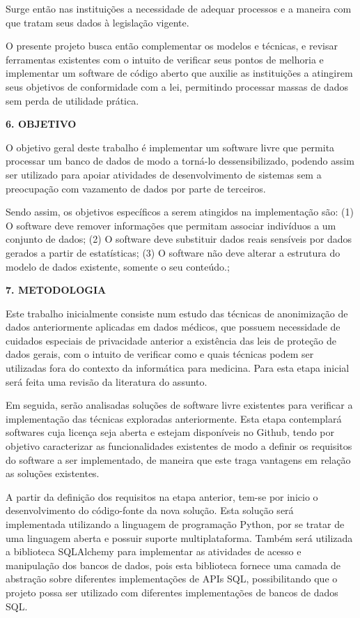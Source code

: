 \documentclass[a4paper,12pt,oneside,openany]{report}
\begin{document}
Surge então nas instituições a necessidade de adequar processos e a maneira com que tratam seus dados à legislação vigente.

O presente projeto busca então complementar os modelos e técnicas, e revisar ferramentas existentes com o intuito de verificar seus pontos de melhoria e implementar um software de código aberto que auxilie as instituições a atingirem seus objetivos de conformidade com a lei, permitindo processar massas de dados sem perda de utilidade prática.

\vspace{0.4cm}
\textbf{6. OBJETIVO}

O objetivo geral deste trabalho é implementar um software livre que permita processar um banco de dados de modo a torná-lo dessensibilizado, podendo assim ser utilizado para apoiar atividades de desenvolvimento de sistemas sem a preocupação com vazamento de dados por parte de terceiros.

Sendo assim, os objetivos específicos a serem atingidos na implementação são: (1) O software deve remover informações que permitam associar indivíduos a um conjunto de dados; (2) O software deve substituir dados reais sensíveis por dados gerados a partir de estatísticas; (3) O software não deve alterar a estrutura do modelo de dados existente, somente o seu conteúdo.;

\vspace{0.4cm}
\textbf{7. METODOLOGIA}

Este trabalho inicialmente consiste num estudo das técnicas de anonimização de dados anteriormente aplicadas em dados médicos, que possuem necessidade de cuidados especiais de privacidade anterior a existência das leis de proteção de dados gerais, com o intuito de verificar como e quais técnicas podem ser utilizadas fora do contexto da informática para medicina. Para esta etapa inicial será feita uma revisão da literatura do assunto.

Em seguida, serão analisadas soluções de software livre existentes para verificar a implementação das técnicas exploradas anteriormente. Esta etapa contemplará softwares cuja licença seja aberta e estejam disponíveis no Github, tendo por objetivo caracterizar as funcionalidades existentes de modo a definir os requisitos do software a ser implementado, de maneira que este traga vantagens em relação as soluções existentes.

A partir da definição dos requisitos na etapa anterior, tem-se por inicio o desenvolvimento do código-fonte da nova solução. Esta solução será implementada utilizando a linguagem de programação Python, por se tratar de uma linguagem aberta e possuir suporte multiplataforma. Também será utilizada a biblioteca SQLAlchemy para implementar as atividades de acesso e manipulação dos bancos de dados, pois esta biblioteca fornece uma camada de abstração sobre diferentes implementações de APIs SQL\cite{sqlalch}, possibilitando que o projeto possa ser utilizado com diferentes implementações de bancos de dados SQL.
\end{document}
